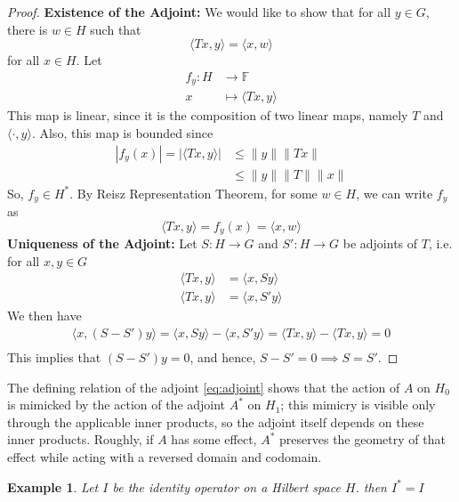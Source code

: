\documentclass{report}
\newtheorem{exm}{Example}
\begin{document}
\begin{proof}
  \textbf{Existence of the Adjoint:} We would like to show that for all $y\in G$, there is $w\in H$ such that 
  $$\langle Tx,y\rangle = \langle x,w\rangle$$
  for all $x\in H$. Let
  $$
  \begin{aligned}
    f_{y}: H&\longrightarrow\mathbb{F} \\
           x&\longmapsto\langle Tx,y\rangle
  \end{aligned}
  $$
  This map is linear, since it is the composition of two linear maps, namely $T$ and $\langle\cdot,y\rangle$. Also, this map is bounded since
  $$
  \begin{aligned}
    |f_{y}(x)| = |\langle Tx,y\rangle| &\leq \lVert y\rVert\lVert Tx\rVert \\
                                       &\leq \lVert y\rVert\lVert T\rVert \lVert x\rVert
  \end{aligned}
  $$
  So, $f_{y}\in H^{*}$. By Reisz Representation Theorem, for some $w\in H$, we can write $f_{y}$ as
  $$
  \langle Tx,y\rangle = f_{y}(x) = \langle x,w\rangle
  $$
  \newline
  \textbf{Uniqueness of the Adjoint:} Let $S:H\to G$ and $S':H\to G$ be adjoints of $T$, i.e. for all $x,y\in G$
  $$
    \begin{aligned}
      \langle Tx,y\rangle &= \langle x,Sy\rangle \\
      \langle Tx,y\rangle &= \langle x,S'y\rangle
    \end{aligned}
  $$
  We then have
  $$
  \begin{aligned}
    \langle x,(S-S')y\rangle = \langle x,Sy\rangle-\langle x,S'y\rangle = \langle Tx,y\rangle-\langle Tx,y\rangle = 0 \\
  \end{aligned}
  $$
  This implies that $(S-S')y=0$, and hence, $S-S'=0\implies S=S'$.
\end{proof}

The defining relation of the adjoint \eqref{eq:adjoint} shows that the action of $A$ on $H_0$ is mimicked by the action of the adjoint $A^{*}$ on $H_1$; this mimicry is visible only through the applicable inner products, so the adjoint itself depends on these inner products. Roughly, if $A$ has some effect, $A^{*}$ preserves the geometry of that effect while acting with a reversed domain and codomain.

\begin{exm}
Let $I$ be the identity operator on a Hilbert space $H$. then $I^{*}=I$
\end{exm}
\end{document}
